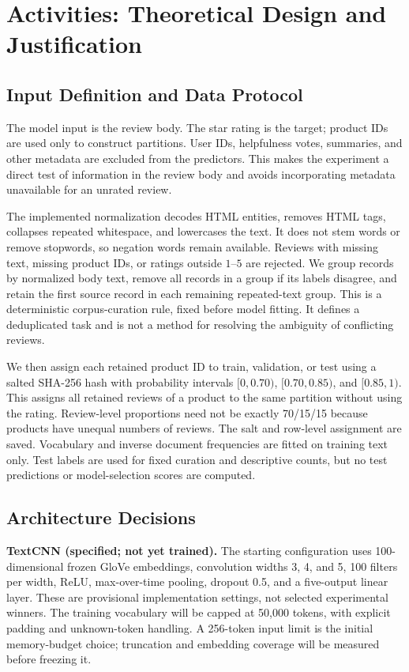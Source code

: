 \documentclass[conference]{IEEEtran}
\begin{document}
\section{Activities: Theoretical Design and Justification}
\subsection{Input Definition and Data Protocol}
The model input is the review body. The star rating is the target; product IDs are used only to construct partitions. User IDs, helpfulness votes, summaries, and other metadata are excluded from the predictors. This makes the experiment a direct test of information in the review body and avoids incorporating metadata unavailable for an unrated review.

The implemented normalization decodes HTML entities, removes HTML tags, collapses repeated whitespace, and lowercases the text. It does not stem words or remove stopwords, so negation words remain available. Reviews with missing text, missing product IDs, or ratings outside $1$--$5$ are rejected. We group records by normalized body text, remove all records in a group if its labels disagree, and retain the first source record in each remaining repeated-text group. This is a deterministic corpus-curation rule, fixed before model fitting. It defines a deduplicated task and is not a method for resolving the ambiguity of conflicting reviews.

We then assign each retained product ID to train, validation, or test using a salted SHA-256 hash with probability intervals $[0,0.70)$, $[0.70,0.85)$, and $[0.85,1)$. This assigns all retained reviews of a product to the same partition without using the rating. Review-level proportions need not be exactly 70/15/15 because products have unequal numbers of reviews. The salt and row-level assignment are saved. Vocabulary and inverse document frequencies are fitted on training text only. Test labels are used for fixed curation and descriptive counts, but no test predictions or model-selection scores are computed.

\subsection{Architecture Decisions}
\textbf{TextCNN (specified; not yet trained).} The starting configuration uses 100-dimensional frozen GloVe embeddings, convolution widths 3, 4, and 5, 100 filters per width, ReLU, max-over-time pooling, dropout 0.5, and a five-output linear layer. These are provisional implementation settings, not selected experimental winners. The training vocabulary will be capped at 50,000 tokens, with explicit padding and unknown-token handling. A 256-token input limit is the initial memory-budget choice; truncation and embedding coverage will be measured before freezing it.
\end{document}
